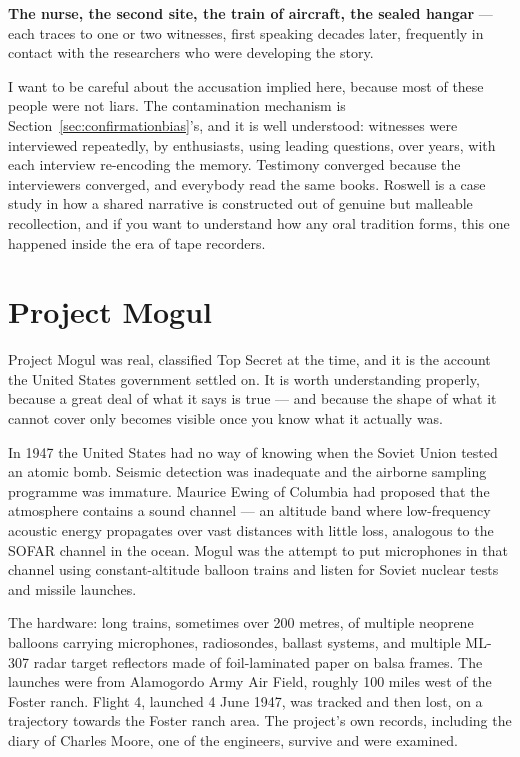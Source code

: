 \textbf{The nurse, the second site, the train of aircraft, the sealed hangar} --- each traces to
one or two witnesses, first speaking decades later, frequently in contact with the researchers who
were developing the story.

I want to be careful about the accusation implied here, because most of these people were not
liars. The contamination mechanism is Section~\ref{sec:confirmationbias}'s, and it is well understood: witnesses were
interviewed repeatedly, by enthusiasts, using leading questions, over years, with each interview
re-encoding the memory. Testimony converged because the interviewers converged, and everybody
read the same books. Roswell is a case study in how a shared narrative is constructed out of
genuine but malleable recollection, and if you want to understand how any oral tradition forms,
this one happened inside the era of tape recorders.

\section{Project Mogul}\label{sec:projectmogul}

Project Mogul was real, classified Top Secret at the time, and it is the account the United States
government settled on. It is worth understanding properly, because a great deal of what it says is
true --- and because the shape of what it cannot cover only becomes visible once you know what it
actually was.

In 1947 the United States had no way of knowing when the Soviet Union tested an atomic bomb.
Seismic detection was inadequate and the airborne sampling programme was immature. Maurice Ewing
of Columbia had proposed that the atmosphere contains a sound channel --- an altitude band where
low-frequency acoustic energy propagates over vast distances with little loss, analogous to the
SOFAR channel in the ocean. Mogul was the attempt to put microphones in that channel using
constant-altitude balloon trains and listen for Soviet nuclear tests and missile launches.

The hardware: long trains, sometimes over 200 metres, of multiple neoprene balloons carrying
microphones, radiosondes, ballast systems, and multiple ML-307 radar target reflectors made of
foil-laminated paper on balsa frames. The launches were from Alamogordo Army Air Field, roughly
100 miles west of the Foster ranch. Flight 4, launched 4 June 1947, was tracked and then lost, on
a trajectory towards the Foster ranch area. The project's own records, including the diary of
Charles Moore, one of the engineers, survive and were examined.

